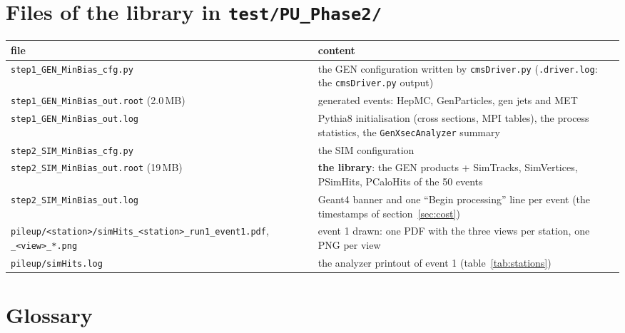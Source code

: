 \documentclass[11pt,a4paper]{article}
\newcommand{\code}[1]{\texttt{#1}}
\begin{document}
\appendix
\section{Files of the library in \code{test/PU\_Phase2/}}
\label{app:files}

\begin{center}\small
\begin{tabularx}{\textwidth}{>{\hsize=1.2\hsize\raggedright\arraybackslash}X>{\hsize=0.8\hsize\raggedright\arraybackslash}X}
\toprule
file & content \\
\midrule
\code{step1\_GEN\_MinBias\_cfg.py} & the GEN configuration written by \code{cmsDriver.py}
  (\code{.driver.log}: the \code{cmsDriver.py} output) \\
\code{step1\_GEN\_MinBias\_out.root} (2.0\,MB) & 50 generated events: HepMC, GenParticles, gen jets and MET \\
\code{step1\_GEN\_MinBias\_out.log} & Pythia8 initialisation (cross sections, MPI tables), the process
  statistics, the \code{GenXsecAnalyzer} summary \\
\code{step2\_SIM\_MinBias\_cfg.py} & the SIM configuration \\
\code{step2\_SIM\_MinBias\_out.root} (19\,MB) & \textbf{the library}: the GEN products + SimTracks,
  SimVertices, PSimHits, PCaloHits of the 50 events \\
\code{step2\_SIM\_MinBias\_out.log} & Geant4 banner and one ``Begin processing'' line per event (the
  timestamps of section~\ref{sec:cost}) \\
\code{pileup/<station>/simHits\_<station>\_run1\_event1.pdf}, \code{\_<view>\_*.png} & event 1 drawn: one PDF
  with the three views per station, one PNG per view \\
\code{pileup/simHits.log} & the analyzer printout of event 1 (table~\ref{tab:stations}) \\
\bottomrule
\end{tabularx}
\end{center}

\section{Glossary}
\label{app:glossary}
\end{document}
